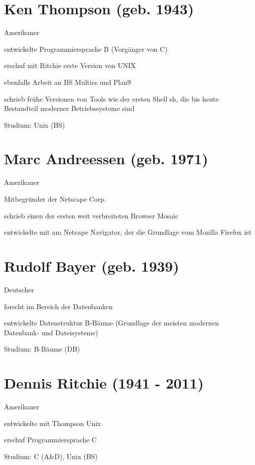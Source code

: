 \documentclass[a4paper,12pt]{report}
\begin{document}
\section*{Ken Thompson (geb. 1943)}
\begin{itemize*}
	\item Amerikaner
	\item entwickelte Programmiersprache B (Vorgänger von C)
	\item erschuf mit Ritchie erste Version von UNIX
	\item ebenfalls Arbeit an BS Multics und Plan9
	\item schrieb frühe Versionen von Tools wie der ersten Shell sh, die bis heute Bestandteil moderner Betriebssysteme sind
	\item Studium: Unix (BS)
\end{itemize*}

\section*{Marc Andreessen (geb. 1971)}
\begin{itemize*}
	\item Amerikaner
	\item Mitbegründer der Netscape Corp.
	\item schrieb einen der ersten weit verbreiteten Browser Mosaic
	\item entwickelte mit am Netcape Navigator, der die Grundlage vom Mozilla Firefox ist
\end{itemize*}

\section*{Rudolf Bayer (geb. 1939)}
\begin{itemize*}
	\item Deutscher
	\item forscht im Bereich der Datenbanken
	\item entwickelte Datenstruktur B-Bäume (Grundlage der meisten modernen Datenbank- und Dateisysteme)
	\item Studium: B-Bäume (DB)
\end{itemize*}

\section*{Dennis Ritchie (1941 - 2011)}
\begin{itemize*}
	\item Amerikaner
	\item entwickelte mit Thompson Unix
	\item erschuf Programmiersprache C
	\item Studium: C (A\&D), Unix (BS)
\end{itemize*}
\end{document}

